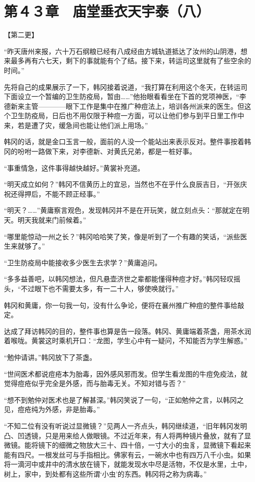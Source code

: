 \section{第４３章　庙堂垂衣天宇泰（八）}

【第二更】

“昨天唐州来报，六十万石纲粮已经有八成经由方城轨道抵达了汝州的山阴港，想来最多再有六七天，剩下的事就能有个了结。接下来，转运司这里就有了些空余的时间。”

先将自己的成果展示了一下，韩冈接着说道，“我打算在利用这个冬天，在转运司下面设立一个暂编的卫生防疫局，暂由……”他抬眼看看坐在下首的党项神医，“李德新来主管————眼下工作是集中在推广种痘法上，培训各州派来的医生。但这个卫生防疫局，日后也不用仅限于种痘一方面，可以让他们参与到平日里工作中来，若是遭了灾，缓急间也能让他们派上用场。”

韩冈的话，就是金口玉言一般，面前的人没一个能站出来表示反对。整件事按着韩冈的吩咐一路做下来，对李德新、对黄氏兄弟，都是一桩好事。

“事重情急，这件事得越快越好。”黄裳补充道。

“明天成立如何？”韩冈不信黄历上的宜忌，当然也不在乎什么良辰吉日，“开张庆祝还得押后，不能不顾正经事。”

“明天？……”黄庸察言观色，发现韩冈并不是在开玩笑，就立刻点头：“那就定在明天。明天我就来门前候着。”

“哪里能惊动一州之长？”韩冈哈哈笑了笑，像是听到了一个有趣的笑话，“派些医生来就够了。”

“卫生防疫局中能接收多少医生去求学？”黄庸追问。

“多多益善吧，以韩冈想法，但凡悬壶济世之辈都能懂得种痘才好。”韩冈轻叹摇头，“不过眼下也不需要太多，有一二十人，够使唤就行。”

韩冈和黄庸，你一句我一句，没有什么争论，便将在襄州推广种痘的整件事给敲定。

达成了拜访韩冈的目的，整件事也算是告一段落。韩冈、黄庸端着茶盏，用茶水润着喉咙。黄裳这时乘机开口：“龙图，学生心中有一疑问，不知能否为学生解惑。”

“勉仲请讲。”韩冈放下了茶盏。

“世间医术都说痘疮本为胎毒，因外感风邪而发。但学生看龙图的牛痘免疫法，就觉得痘疮似乎完全是外感，而与胎毒无关。不知对错与否？”

“想不到勉仲对医术也是了解甚深。”韩冈笑说了一句，“正如勉仲之言，以韩冈之见，痘疮纯为外感，非是胎毒。”

“不知二位有没有听说过显微镜？”见两人一齐点头，韩冈继续道，“旧年韩冈发明凸、凹透镜，只是用来给人做眼镜。不过近年来，有人将两种镜片叠放，就有了显微镜。能将镜下的细微之物放大三十、四十倍，一寸大小的虫豸，显微镜下看起来能有四尺。一根发丝可与手指相比。佛家有云，一碗水中也有四万八千小虫。如果将一滴河中或井中的清水放在镜下，就能发现水中尽是活物，不仅是水里，土中，树上，家中，到处都有这些所谓‘小虫’的东西。韩冈将之称为病毒。”

